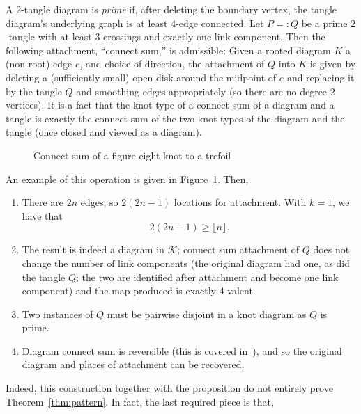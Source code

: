 \documentclass[submission%
]{dmtcs}
\newcommand{\KnotDiaClass}{\mathscr{K}}
\begin{document}
A $2$-tangle diagram is \emph{prime} if, after deleting the boundary
vertex, the tangle diagram's underlying graph is at least 4-edge
connected. Let $P =: Q$ be a prime $2$-tangle with at least $3$
crossings and exactly one link component. Then the following
attachment, ``connect sum,'' is admissible: Given a rooted diagram $K$
a (non-root) edge $e$, and choice of direction, the attachment of $Q$
into $K$ is given by deleting a (sufficiently small) open disk around
the midpoint of $e$ and replacing it by the tangle $Q$ and smoothing
edges appropriately (so there are no degree 2 vertices). It is a fact
that the knot type of a connect sum of a diagram and a tangle is
exactly the connect sum of the two knot types of the diagram and the
tangle (once closed and viewed as a diagram).
\begin{figure}[hbtp]
  \centering
  \hfil
  \hfil
  \caption{Connect sum of a figure eight knot to a trefoil}
  \label{fig:csexample}
\end{figure}
An example of
this operation is given in Figure~\ref{fig:csexample}. Then,
\begin{enumerate}
\item There are $2n$ edges, so $2(2n-1)$ locations for
  attachment. With $k = 1$, we have that
  \begin{displaymath}
    2(2n-1) \ge \lfloor n \rfloor.
  \end{displaymath}
\item The result is indeed a diagram in $\KnotDiaClass$; connect sum
  attachment of $Q$ does not change the number of link components (the
  original diagram had one, as did the tangle $Q$; the two are
  identified after attachment and become one link component) and the
  map produced is exactly 4-valent.
\item Two instances of $Q$ must be pairwise disjoint in a knot diagram
  as $Q$ is prime.
\item Diagram connect sum is reversible (this is covered
  in~\cite{CCMknotdiagrams2015}), and so the original diagram and
  places of attachment can be recovered.
\end{enumerate}

Indeed, this construction together with the proposition do not
entirely prove Theorem~\ref{thm:pattern}. In fact, the last required
piece is that,
\end{document}
